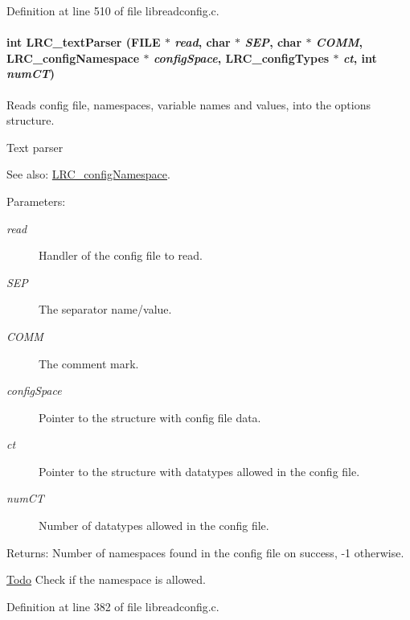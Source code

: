 Definition at line 510 of file libreadconfig.c.\hypertarget{group___l_r_c__parser_g4b1c98d54591fd4d05cc1caee09cbd35}{
\paragraph[{LRC\_\-textParser}]{\setlength{\rightskip}{0pt plus 5cm}int LRC\_\-textParser (FILE $\ast$ {\em read}, \/  char $\ast$ {\em SEP}, \/  char $\ast$ {\em COMM}, \/  {\bf LRC\_\-configNamespace} $\ast$ {\em configSpace}, \/  {\bf LRC\_\-configTypes} $\ast$ {\em ct}, \/  int {\em numCT})}\hfill}
\label{group___l_r_c__parser_g4b1c98d54591fd4d05cc1caee09cbd35}


Reads config file, namespaces, variable names and values, into the options structure. 

Text parser

\begin{Desc}
\item[See also:]\hyperlink{struct_l_r_c__config_namespace}{LRC\_\-configNamespace}.\end{Desc}
\begin{Desc}
\item[Parameters:]
\begin{description}
\item[{\em read}]Handler of the config file to read.\item[{\em SEP}]The separator name/value.\item[{\em COMM}]The comment mark.\item[{\em configSpace}]Pointer to the structure with config file data.\item[{\em ct}]Pointer to the structure with datatypes allowed in the config file.\item[{\em numCT}]Number of datatypes allowed in the config file.\end{description}
\end{Desc}
\begin{Desc}
\item[Returns:]Number of namespaces found in the config file on success, -1 otherwise.\end{Desc}
\begin{Desc}
\item[\hyperlink{todo__todo000004}{Todo}]Check if the namespace is allowed. \end{Desc}


Definition at line 382 of file libreadconfig.c.